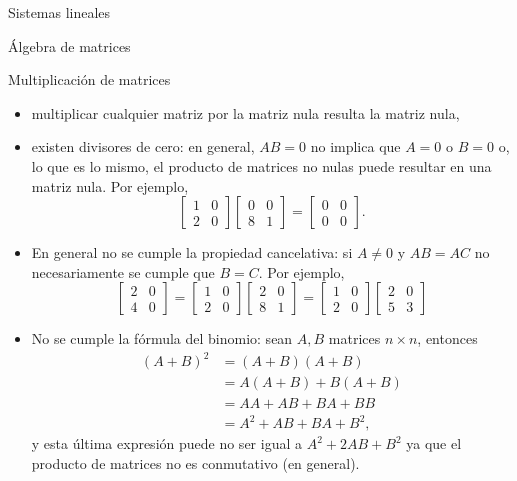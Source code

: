 \documentclass[a4paper,12pt,twoside,spanish,reqno]{amsbook}
\theoremstyle{definition}
\theoremstyle{remark}
\begin{document}
\begin{chapter}{Sistemas lineales}
\begin{section}{Álgebra de matrices}
\begin{subsection}{Multiplicación de matrices}
				\begin{itemize}
					\item multiplicar cualquier matriz por la matriz nula resulta la matriz nula,
					\item existen divisores de cero: en general, $AB = 0$ no implica que $A = 0$ o $B = 0$  o,  lo que es lo mismo, el producto de matrices no nulas puede resultar en una matriz nula. Por
					ejemplo,
					\begin{equation*}
					\begin{bmatrix}1&0\\2&0\end{bmatrix} \begin{bmatrix}0&0\\8&1\end{bmatrix} = \begin{bmatrix}0&0\\0&0\end{bmatrix}.
					\end{equation*}
					\item En general no se cumple la propiedad cancelativa: si $A\not=0$ y  $AB = AC$ no necesariamente se cumple que $B = C$. Por
					ejemplo,
					\begin{equation*}
					\begin{bmatrix}2&0\\4&0\end{bmatrix}=
					\begin{bmatrix}1&0\\2&0\end{bmatrix} \begin{bmatrix}2&0\\8&1\end{bmatrix} =
					\begin{bmatrix}1&0\\2&0\end{bmatrix} \begin{bmatrix}2&0\\5&3\end{bmatrix}
					\end{equation*}
					\item No se cumple la fórmula del binomio: 	sean $A, B$ matrices $n \times n$, entonces		
					\begin{align*}
					(A+B)^2 &= (A+B)(A+B) \\&= A(A+B) + B(A+B) \\&= AA + AB + BA + BB \\&= A^2 + AB + BA + B^2,
					\end{align*}
					y  esta última expresión puede no ser  igual a $A^2 + 2AB + B^2$ ya que el producto de matrices no es conmutativo (en general). 
				\end{itemize}
			\end{subsection}
		

\end{section}
\end{chapter}
\end{document}
